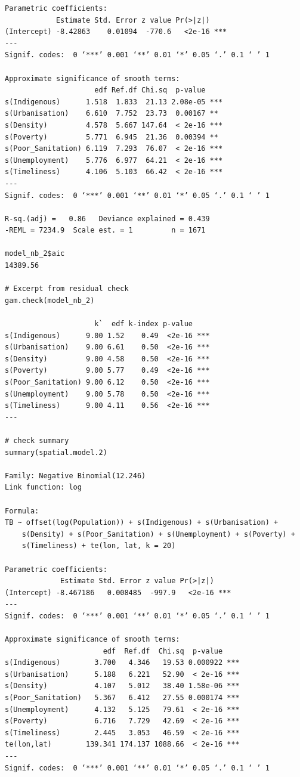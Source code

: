 \begin{verbatim}
Parametric coefficients:
            Estimate Std. Error z value Pr(>|z|)    
(Intercept) -8.42863    0.01094  -770.6   <2e-16 ***
---
Signif. codes:  0 ‘***’ 0.001 ‘**’ 0.01 ‘*’ 0.05 ‘.’ 0.1 ‘ ’ 1

Approximate significance of smooth terms:
                     edf Ref.df Chi.sq  p-value    
s(Indigenous)      1.518  1.833  21.13 2.08e-05 ***
s(Urbanisation)    6.610  7.752  23.73  0.00167 ** 
s(Density)         4.578  5.667 147.64  < 2e-16 ***
s(Poverty)         5.771  6.945  21.36  0.00394 ** 
s(Poor_Sanitation) 6.119  7.293  76.07  < 2e-16 ***
s(Unemployment)    5.776  6.977  64.21  < 2e-16 ***
s(Timeliness)      4.106  5.103  66.42  < 2e-16 ***
---
Signif. codes:  0 ‘***’ 0.001 ‘**’ 0.01 ‘*’ 0.05 ‘.’ 0.1 ‘ ’ 1

R-sq.(adj) =   0.86   Deviance explained = 0.439
-REML = 7234.9  Scale est. = 1         n = 1671

model_nb_2$aic
14389.56

# Excerpt from residual check
gam.check(model_nb_2)

                     k`  edf k-index p-value    
s(Indigenous)      9.00 1.52    0.49  <2e-16 ***
s(Urbanisation)    9.00 6.61    0.50  <2e-16 ***
s(Density)         9.00 4.58    0.50  <2e-16 ***
s(Poverty)         9.00 5.77    0.49  <2e-16 ***
s(Poor_Sanitation) 9.00 6.12    0.50  <2e-16 ***
s(Unemployment)    9.00 5.78    0.50  <2e-16 ***
s(Timeliness)      9.00 4.11    0.56  <2e-16 ***
---

# check summary
summary(spatial.model.2)

Family: Negative Binomial(12.246) 
Link function: log 

Formula:
TB ~ offset(log(Population)) + s(Indigenous) + s(Urbanisation) + 
    s(Density) + s(Poor_Sanitation) + s(Unemployment) + s(Poverty) + 
    s(Timeliness) + te(lon, lat, k = 20)

Parametric coefficients:
             Estimate Std. Error z value Pr(>|z|)    
(Intercept) -8.467186   0.008485  -997.9   <2e-16 ***
---
Signif. codes:  0 ‘***’ 0.001 ‘**’ 0.01 ‘*’ 0.05 ‘.’ 0.1 ‘ ’ 1

Approximate significance of smooth terms:
                       edf  Ref.df  Chi.sq  p-value    
s(Indigenous)        3.700   4.346   19.53 0.000922 ***
s(Urbanisation)      5.188   6.221   52.90  < 2e-16 ***
s(Density)           4.107   5.012   38.40 1.58e-06 ***
s(Poor_Sanitation)   5.367   6.412   27.55 0.000174 ***
s(Unemployment)      4.132   5.125   79.61  < 2e-16 ***
s(Poverty)           6.716   7.729   42.69  < 2e-16 ***
s(Timeliness)        2.445   3.053   46.59  < 2e-16 ***
te(lon,lat)        139.341 174.137 1088.66  < 2e-16 ***
---
Signif. codes:  0 ‘***’ 0.001 ‘**’ 0.01 ‘*’ 0.05 ‘.’ 0.1 ‘ ’ 1


\end{verbatim}
